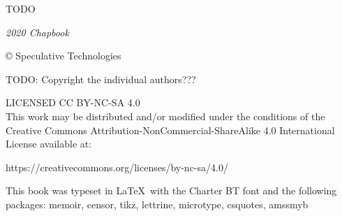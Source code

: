 



\pagestyle{empty}

{
\null\vfill

\begin{flushleft}

{\small
TODO

\textit{2020 Chapbook}


© Speculative Technologies

TODO: Copyright the individual authors???

\bigskip


LICENSED CC BY-NC-SA 4.0 \\
This work may be distributed and/or modified under the conditions of the Creative Commons Attribution-NonCommercial-ShareAlike 4.0 International License available at:
\begin{chatlog}
https://creativecommons.org/licenses/by-nc-sa/4.0/
\end{chatlog}

This book was typeset in \LaTeX\ with the Charter BT font and the following packages:
  memoir,
  censor,
  tikz,
  lettrine,
  microtype,
  csquotes,
  amssmyb

\bigskip

}


\end{flushleft}
}


\clearpage

\titleAM



\frontmatter

{\setlength{\beforechapskip}{0pt}
\begin{KeepFromToc}
  \tableofcontents*
\end{KeepFromToc}
}
%

\mainmatter
\raggedbottom

\pagestyle{plain}

















